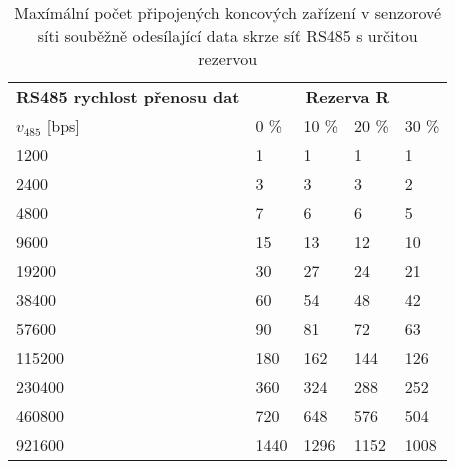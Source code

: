 \begin{table}[h]
\centering
\footnotesize
\caption{Maxímální počet připojených koncových zařízení v senzorové síti souběžně odesílající data skrze síť RS485 s určitou rezervou} 
\begin{ctucolortab}
\begin{tabular} {|p{2.5cm}|llll|}
    \hline

\textbf{RS485 rychlost přenosu dat} &       \multicolumn{4}{c|}{\textbf{Rezerva R}}	  	    \\

$v_{485}$ {[bps]}  &	0 \%	&	10 \%	&	20 \%	&	30 \%  \\ \hline

  1200~~~ &    1	&    1	&    1	&    1 \\
  2400~~~ &    3	&    3	&    3	&    2 \\
  4800~~~ &    7	&    6	&    6	&    5 \\
  9600~~~ &   15	&   13	&   12	&   10 \\
 19200~~~ &   30	&   27	&   24	&   21 \\
 38400~~~ &   60	&   54	&   48	&   42 \\
 57600~~~ &   90	&   81	&   72	&   63 \\
115200~~~ &  180	&  162	&  144	&  126 \\
230400~~~ &  360	&  324	&  288	&  252 \\
460800~~~ &  720	&  648	&  576	&  504 \\
921600~~~ & 1440	& 1296	& 1152	& 1008 \\
\hline

\end{tabular}
\end{ctucolortab}

\label{tab:max-sensor-nodes}
\end{table}















